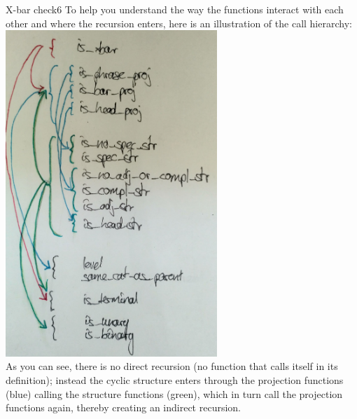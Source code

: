 \begin{task}{X-bar check}{6}
To help you understand the way the functions interact with each other and where the recursion enters, here is an illustration of the call hierarchy:\\
\includegraphics[width=8cm]{call_structure.jpg}\\
As you can see, there is no direct recursion (no function that calls itself in its definition); instead the cyclic structure enters through the projection functions (blue) calling the structure functions (green), which in turn call the projection functions again, thereby creating an indirect recursion.


\end{task}



